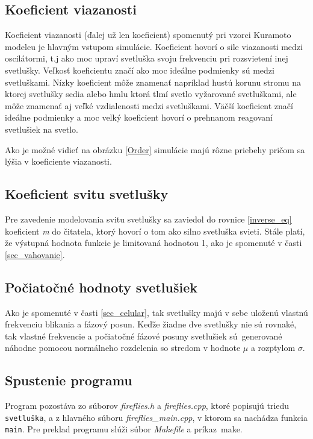 \documentclass[a4paper, 11pt]{article}
\begin{document}
\subsection{Koeficient viazanosti}
Koeficient viazanosti (ďalej už len koeficient) spomenutý pri vzorci Kuramoto modeleu je hlavným vstupom simulácie. Koeficient hovorí o sile viazanosti medzi oscilátormi, t.j ako moc upraví svetluška svoju frekvenciu pri rozsvietení inej svetlušky. Veľkosť koeficientu značí ako moc ideálne podmienky sú medzi svetluškami. Nízky koeficient môže znamenať napríklad hustú korunu stromu na ktorej svetlušky sedia alebo hmlu ktorá tlmí svetlo vyžarované svetluškami, ale môže znamenať aj veľké vzdialenosti medzi svetluškami. Väčší koeficient značí ideálne podmienky a moc velký koeficient hovorí o prehnanom reagovaní svetlušiek na svetlo.

Ako je možné vidieť na obrázku \ref{Order} simulácie majú rôzne priebehy pričom sa lýšia v koeficiente viazanosti. 


\subsection{Koeficient svitu svetlušky}
Pre zavedenie modelovania svitu svetlušky sa zaviedol do rovnice \ref{inverse_eq} koeficient \textit{m} do čitatela, ktorý hovorí o tom ako silno svetluška svieti. Stále platí, že výstupná hodnota funkcie je limitovaná hodnotou 1, ako je spomenuté v časti \ref{sec_vahovanie}. 





\subsection{Počiatočné hodnoty svetlušiek}
Ako je spomenuté v časti \ref{sec_celular}, tak svetlušky majú v sebe uloženú vlastnú frekvenciu blikania a fázový posun. Keďže žiadne dve svetlušky nie sú rovnaké, tak vlastné frekvencie a počiatočné fázové posuny svetlušiek sú~generované náhodne pomocou normálneho rozdelenia so stredom v hodnote $\mu$ a rozptylom $\sigma$. 



\subsection{Spustenie programu}
Program pozostáva zo súborov \textit{fireflies.h} a \textit{fireflies.cpp}, ktoré popisujú triedu \texttt{svetluška}, a z hlavného súboru \textit{fireflies\_main.cpp}, v ktorom sa nachádza funkcia \texttt{main}. Pre preklad programu slúži súbor \textit{Makefile} a príkaz~make.
\end{document}
